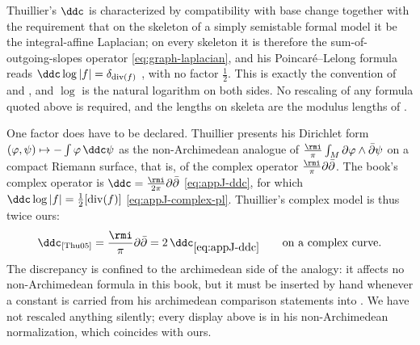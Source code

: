 \begin{remark}
\label{rem:ch25-thuillier-normalization}
Thuillier's $\ddc$ is characterized by compatibility with base change
together with the requirement that on the skeleton of a simply semistable
formal model it be the integral-affine Laplacian; on every skeleton it is
therefore the sum-of-outgoing-slopes operator \eqref{eq:graph-laplacian},
and his Poincar\'e--Lelong formula reads
$\ddc\log|f|=\delta_{\operatorname{div}(f)}$
\cite[Proposition~3.3.15]{Thu05}, with no factor $\tfrac12$.  This is
exactly the convention of  and
, and $\log$ is the natural logarithm on both
sides.  No rescaling of any formula quoted above is required, and the
lengths on skeleta are the modulus lengths of
.

One factor does have to be declared.  Thuillier presents his Dirichlet form
$(\varphi,\psi)\mapsto-\int\varphi\,\ddc\psi$ as the non-Archimedean
analogue of
$\frac{\rmi}{\pi}\int_M\partial\varphi\wedge\bar\partial\psi$
on a compact Riemann surface, that is, of the complex operator
$\frac{\rmi}{\pi}\partial\bar\partial$.  The book's complex operator is
$\ddc=\frac{\rmi}{2\pi}\partial\bar\partial$ \eqref{eq:appJ-ddc}, for which
$\ddc\log|f|=\tfrac12[\operatorname{div}(f)]$
\eqref{eq:appJ-complex-pl}.  Thuillier's complex model is thus twice ours:
\[
 \ddc_{\text{\cite{Thu05}}}
 =\frac{\rmi}{\pi}\partial\bar\partial
 =2\,\ddc_{\eqref{eq:appJ-ddc}}
 \qquad\text{on a complex curve.}
\]
The discrepancy is confined to the archimedean side of the analogy: it
affects no non-Archimedean formula in this book, but it must be inserted by
hand whenever a constant is carried from his archimedean comparison
statements into .  We have not rescaled anything
silently; every display above is in his non-Archimedean normalization, which
coincides with ours.
\end{remark}

